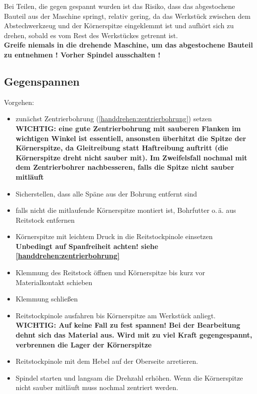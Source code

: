 \documentclass{\basedir/fablab-document}
\begin{document}
Bei Teilen, die gegen gespannt wurden ist das Risiko, dass das abgestochene Bauteil aus der Maschine springt, relativ gering, da das Werkstück zwischen dem Abstechwerkzeug und der Körnerspitze eingeklemmt ist und aufhört sich zu drehen, sobald es vom Rest des Werkstückes getrennt ist. \\
\textbf{Greife niemals in die drehende Maschine, um das abgestochene Bauteil zu entnehmen ! Vorher Spindel ausschalten !}


\subsection{Gegenspannen}
\label{handdrehen:gegenspannen}

Vorgehen:
\begin{itemize}
\item zunächst Zentrierbohrung (\ref{handdrehen:zentrierbohrung}) setzen\\
\textbf{WICHTIG: eine gute Zentrierbohrung mit sauberen Flanken im wichtigen Winkel ist essentiell, ansonsten überhitzt die Spitze der Körnerspitze, da Gleitreibung statt Haftreibung auftritt (die Körnerspitze dreht nicht sauber mit). Im Zweifelsfall nochmal mit dem Zentrierbohrer nachbesseren, falls die Spitze nicht sauber mitläuft}
\item Sicherstellen, dass alle Späne aus der Bohrung entfernt sind
\item falls nicht die mitlaufende Körnerspitze montiert ist, Bohrfutter o.\,ä. aus Reitstock entfernen
\item Körnerspitze mit leichtem Druck in die Reitstockpinole einsetzen\\
\textbf{Unbedingt auf Spanfreiheit achten! siehe \ref{handdrehen:zentrierbohrung}}
\item Klemmung des Reitstock öffnen und Körnerspitze bis kurz vor Materialkontakt schieben 
\item Klemmung schließen
\item Reitstockpinole ausfahren bis Körnerspitze am Werkstück anliegt.\\ \textbf{WICHTIG: Auf keine Fall zu fest spannen! Bei der Bearbeitung dehnt sich das Material aus. Wird mit zu viel Kraft gegengespannt, verbrennen die Lager der Körnerspitze}
\item Reitstockpinole mit dem Hebel auf der Oberseite arretieren.
\item Spindel starten und langsam die Drehzahl erhöhen. Wenn die Körnerspitze nicht sauber mitläuft muss nochmal zentriert werden.
\end{itemize}
\end{document}
